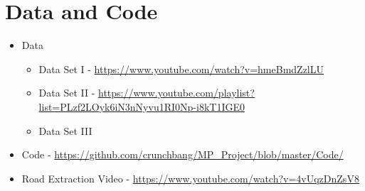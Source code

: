 \documentclass[journal]{IEEEtran}
\begin{document}
\vspace{0.5cm}

\ifCLASSOPTIONcaptionsoff
  \newpage
\fi


\appendices
\section{Data and Code}
\begin{itemize}
\item Data 
\begin{itemize}
\item Data Set I - \url{https://www.youtube.com/watch?v=hmeBmdZzlLU}
\item Data Set II - \url{https://www.youtube.com/playlist?list=PLzf2LOyk6iN3nNyvu1RI0Np-i8kT1IGE0}
\item Data Set III \cite{dataset}
\end{itemize}

\item Code - \url{https://github.com/crunchbang/MP_Project/blob/master/Code/}
\item Road Extraction Video - \url{https://www.youtube.com/watch?v=4vUqzDnZsV8}
\end{itemize}

\end{document}
